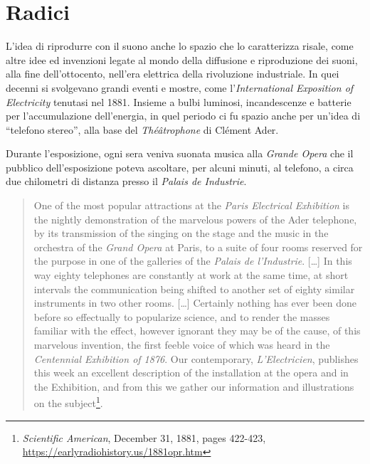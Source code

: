 \section{Radici}

L'idea di riprodurre con il suono anche lo spazio che lo caratterizza risale,
come altre idee ed invenzioni legate al mondo della diffusione e riproduzione
dei suoni, alla fine dell'ottocento, nell'era elettrica della rivoluzione
industriale. In quei decenni si svolgevano grandi eventi e mostre,
come l'\emph{International Exposition of Electricity} tenutasi nel 1881.
Insieme a bulbi luminosi, incandescenze e batterie per l'accumulazione
dell'energia, in quel periodo ci fu spazio anche per un'idea di “telefono stereo”,
alla base del \emph{Théâtrophone} di Clément Ader.

Durante l'esposizione, ogni sera veniva suonata musica alla \emph{Grande Opera}
che il pubblico dell'esposizione poteva ascoltare, per alcuni minuti, al telefono,
a circa due chilometri di distanza presso il \emph{Palais de Industrie}.

\begin{quotation}
One of the most popular attractions at the \emph{Paris Electrical Exhibition} is
the nightly demonstration of the marvelous powers of the Ader telephone, by its
transmission of the singing on the stage and the music in the orchestra of the
\emph{Grand Opera} at Paris, to a suite of four rooms reserved for the purpose
in one of the galleries of the \emph{Palais de l'Industrie}. [\ldots] In this
way eighty telephones are constantly at work at the same time, at short
intervals the communication being shifted to another set of eighty similar
instruments in two other rooms. [\ldots] Certainly nothing has ever been done
before so effectually to popularize science, and to render the masses familiar
with the effect, however ignorant they may be of the cause, of this marvelous
invention, the first feeble voice of which was heard in the \emph{Centennial
Exhibition of 1876}. Our contemporary, \emph{L'Electricien}, publishes this week
an excellent description of the installation at the opera and in the Exhibition,
and from this we gather our information and illustrations on the
subject\footnote{\emph{Scientific American}, December 31, 1881, pages 422-423,
\url{https://earlyradiohistory.us/1881opr.htm}}.
\end{quotation}

